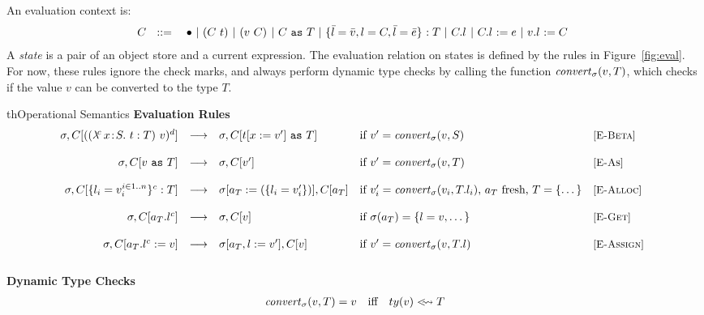 \documentclass{article}
\newcommand{\fun}[1]{\mbox{\it #1\/}}
\newcommand{\safe}{\bullet}
\newcommand{\lam}[5]{\lambda\!^{#1}\,#2\!:\!#3.\,\,#5:#4}
\newcommand{\app}[3]{(#2~#3)^{#1}}
\newcommand{\hole}{\safe}
\newcommand{\App}[2]{#1[#2]}
\newcommand{\cast}[2]{#1~\t{as}~#2}
\newcommand{\comsubtype}[2]{#1 <\!\!\leadsto #2}
\newcommand{\convert}[2]{{#1}\convertword{#2}}
\newcommand{\convertword}{\mbox{\,\,$\sim :$\,\,}}
\renewcommand{\t}[1]{{\tt #1}}
\newcommand{\red}[0]{\longrightarrow}  %
\newcommand{\lred}[0]{\red}  %
\newcommand{\objty}[1]{\{#1\}}
\newcommand{\obje}[3]{\{#2\}^{#1}:{#3}}
\newcommand{\objv}[1]{\{#1\}}
\newcommand{\objget}[3]{#2.#3^{#1}}
\newcommand{\objset}[4]{#2.#3^{#1}:=#4}
\newcommand{\wrap}[2]{#1~\t{wrap}~#2}
\newcommand{\allocty}[1]{ty(#1)}
\renewcommand{\convert}[2]{\fun{convert}_{\sigma}(#1,#2)}
\newcommand{\istype}[2]{#1~\t{is}_{\sigma}~ #2}
\begin{document}
An evaluation context is:
\[
C ~~::=
\begin{array}[t]{@{}l}
		~~~\hole
	~|~	\app{}{C}{t} 
	~|~	\app{}{v}{C}
	~|~ \cast{C}{T} 
	~|~ \obje{}{\bar l=\bar v,l=C, \bar l =\bar e}{T}
	~|~ \objget{}{C}{l}
	~|~ \objset{}{C}{l}{e}
	~|~ \objset{}{v}{l}{C} 
\end{array}
\]
A \emph{state} is a pair of an object store and a current expression.
The evaluation relation on states is defined by the rules in Figure~\ref{fig:eval}.
For now, these rules ignore the check marks, and always perform dynamic type checks by calling the function $\convert{v}{T}$, which checks if the value $v$ can be converted to the type $T$. 

\begin{displayfigure}{th}{Operational Semantics}
\label{fig:eval} 
\label{fig:convert} 
\footnotesize
{\bf Evaluation Rules}
\[
\begin{array}{@{}rclll}
	\sigma,C[{\app{d}{(\lam{c}{x}{S}{T}{t})}{v}}]
	&\lred&
	\sigma,C[\cast{t[x:=v']}{T}]
	&\mbox{if $v'=\convert v S$}
	&\rel{E-Beta}
\\~\\
	\sigma,C[\cast{v}{T}]
	&\lred&
	\sigma,C[v']
	&\mbox{if $v'=\convert v T$}
	&\rel{E-As}
\\~\\
	\sigma,C[\obje{c}{l_i=v_i^{i\in 1..n}}{T}]
	&\lred&
	\sigma[a_T:=(\objv{l_i=v'_i})],C[a_T] 
	&\mbox{if $v_i'=\convert{v_i}{T.l_i}$, $a_T$ fresh, $T=\objty{\dots}$}
	&\rel{E-Alloc} 
\\~\\
	\sigma,C[\objget{c}{a_T}{l}]
	&\lred&
	\sigma,C[v]
	&\mbox{if $\sigma(a_T)=\objv{l=v,\dots}$}
	&\rel{E-Get}
\\~\\
	\sigma,C[\objset{c}{a_T}{l}{v}]
	&\lred&
	\sigma[a_T,l:=v'],C[v] 
	&\mbox{if $v'=\convert v {T.l}$}
	&\rel{E-Assign} 
\\~\\
\end{array}
\]
{\bf Dynamic Type Checks}
\[
\begin{array}{rcl}
	\convert{v}{T} = v &\mbox{iff}&%
	 \mbox{$\comsubtype{\allocty v}{T}$} \\
\end{array}
\]
 \end{displayfigure} 
\end{document}
